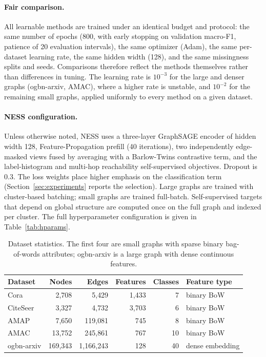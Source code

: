 \paragraph{Fair comparison.} All learnable methods are trained under an identical budget and protocol: the same number of epochs (800, with early stopping on validation macro-F1, patience of 20 evaluation intervals), the same optimizer (Adam), the same per-dataset learning rate, the same hidden width (128), and the same missingness splits and seeds. Comparisons therefore reflect the methods themselves rather than differences in tuning. The learning rate is $10^{-3}$ for the large and denser graphs (ogbn-arxiv, AMAC), where a higher rate is unstable, and $10^{-2}$ for the remaining small graphs, applied uniformly to every method on a given dataset.

\paragraph{NESS configuration.} Unless otherwise noted, NESS uses a three-layer GraphSAGE encoder of hidden width 128, Feature-Propagation prefill (40 iterations), two independently edge-masked views fused by averaging with a Barlow-Twins contrastive term, and the label-histogram and multi-hop reachability self-supervised objectives. Dropout is 0.3. The loss weights place higher emphasis on the classification term (Section~\ref{sec:experiments} reports the selection). Large graphs are trained with cluster-based batching; small graphs are trained full-batch. Self-supervised targets that depend on global structure are computed once on the full graph and indexed per cluster. The full hyperparameter configuration is given in Table~\ref{tab:hparams}.

\begin{table}[t]
\centering
\caption{Dataset statistics. The first four are small graphs with sparse binary bag-of-words attributes; ogbn-arxiv is a large graph with dense continuous features.}
\label{tab:datasets}
\small
\begin{tabular}{@{}lrrrrl@{}}
\toprule
\textbf{Dataset} & \textbf{Nodes} & \textbf{Edges} & \textbf{Features} & \textbf{Classes} & \textbf{Feature type} \\
\midrule
Cora        & 2{,}708     & 5{,}429       & 1{,}433 & 7 & binary BoW \\
CiteSeer    & 3{,}327     & 4{,}732       & 3{,}703 & 6 & binary BoW \\
AMAP        & 7{,}650     & 119{,}081     & 745     & 8 & binary BoW \\
AMAC        & 13{,}752    & 245{,}861     & 767     & 10 & binary BoW \\
ogbn-arxiv  & 169{,}343   & 1{,}166{,}243 & 128     & 40 & dense embedding \\
\bottomrule
\end{tabular}
\end{table}
